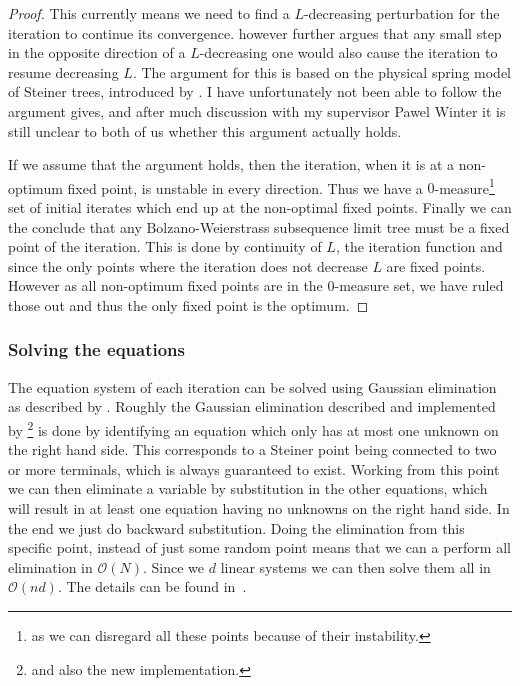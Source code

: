 \begin{proof}
This currently means we need to find a $L$-decreasing perturbation for
the iteration to continue its convergence. \citeauthor{smith1992} however
further argues that any small step in the opposite direction of a $L$-decreasing
one would also cause the iteration to resume decreasing $L$. The argument for
this is based on the physical spring model of Steiner trees, introduced by
\textcite{gilbert1968}. I have unfortunately not been able to follow the
argument \textcite{smith1992} gives, and after much discussion with my
supervisor Pawel Winter it is still unclear to both of us whether this argument
actually holds.

If we assume that the argument holds, then the iteration, when it is at a
non-optimum fixed point, is unstable in every direction. Thus we have a
$0$-measure\footnote{as we can disregard all these points because of their
  instability.} set of initial iterates which end up at the non-optimal fixed
points. Finally we can the conclude that any Bolzano-Weierstrass subsequence
limit tree must be a fixed point of the iteration. This is done by continuity of
$L$, the iteration function and since the only points where the iteration does
not decrease $L$ are fixed points. However as all non-optimum fixed points are
in the 0-measure set, we have ruled those out and thus the only fixed point is
the optimum.

\end{proof}

\subsubsection{Solving the equations}
\label{sec:solving-equations}

The equation system of each iteration can be solved using Gaussian elimination
as described by \textcite[p.~148--149]{smith1992}. Roughly the Gaussian
elimination described and implemented by \citeauthor{smith1992}\footnote{and
  also the new implementation.} is done by identifying an equation which only
has at most one unknown on the right hand side. This corresponds to a Steiner
point being connected to two or more terminals, which is always guaranteed to
exist. Working from this point we can then eliminate a variable by substitution
in the other equations, which will result in at least one equation having no
unknowns on the right hand side. In the end we just do backward substitution.
Doing the elimination from this specific point, instead of just some random
point means that we can a perform all elimination in $\mathcal O(N)$. Since we
$d$ linear systems we can then solve them all in $\mathcal{O}(n d)$. The details
can be found in~\cite[p.~148--149]{smith1992}.

